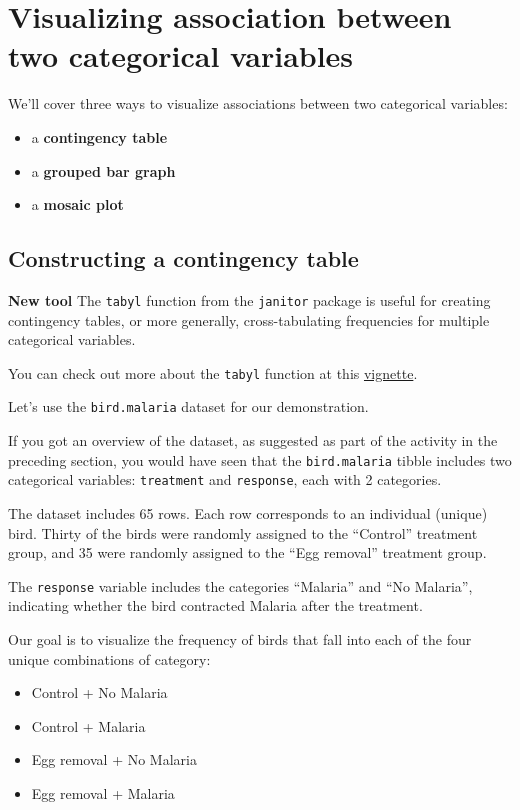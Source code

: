 \documentclass[
]{book}
\providecommand{\tightlist}{%
  \setlength{\itemsep}{0pt}\setlength{\parskip}{0pt}}
\begin{document}
\section{Visualizing association between two categorical variables}\label{vis2_2cat}

We'll cover three ways to visualize associations between two categorical variables:

\begin{itemize}
\tightlist
\item
  a \textbf{contingency table}
\item
  a \textbf{grouped bar graph}
\item
  a \textbf{mosaic plot}
\end{itemize}

\subsection{Constructing a contingency table}\label{vis2_cont_table}

\textbf{New tool}
The \texttt{tabyl} function from the \texttt{janitor} package is useful for creating contingency tables, or more generally, cross-tabulating frequencies for multiple categorical variables.

You can check out more about the \texttt{tabyl} function at this \href{https://cran.r-project.org/web/packages/janitor/vignettes/tabyls.html}{vignette}.

Let's use the \texttt{bird.malaria} dataset for our demonstration.

If you got an overview of the dataset, as suggested as part of the activity in the preceding section, you would have seen that the \texttt{bird.malaria} tibble includes two categorical variables: \texttt{treatment} and \texttt{response}, each with 2 categories.

The dataset includes 65 rows. Each row corresponds to an individual (unique) bird. Thirty of the birds were randomly assigned to the ``Control'' treatment group, and 35 were randomly assigned to the ``Egg removal'' treatment group.

The \texttt{response} variable includes the categories ``Malaria'' and ``No Malaria'', indicating whether the bird contracted Malaria after the treatment.

Our goal is to visualize the frequency of birds that fall into each of the four unique combinations of category:

\begin{itemize}
\tightlist
\item
  Control + No Malaria
\item
  Control + Malaria
\item
  Egg removal + No Malaria
\item
  Egg removal + Malaria
\end{itemize}
\end{document}
